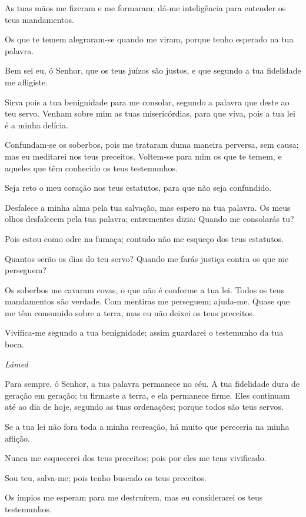 As tuas mãos me fizeram e me formaram; dá-me inteligência para
entender os teus mandamentos.

Os que te temem alegraram-se quando me viram, porque tenho
esperado na tua palavra.

Bem sei eu, ó Senhor, que os teus juízos são justos, e que
segundo a tua fidelidade me afligiste.

Sirva pois a tua benignidade para me consolar, segundo a palavra
que deste ao teu servo. Venham sobre mim as tuas
misericórdias, para que viva, pois a tua lei é a minha delícia.

Confundam-se os soberbos, pois me trataram duma maneira perversa,
sem causa; mas eu meditarei nos teus preceitos. Voltem-se
para mim os que te temem, e aqueles que têm conhecido os teus
testemunhos.

Seja reto o meu coração nos teus estatutos, para que não seja
confundido.

Desfalece a minha alma pela tua salvação, mas espero na tua
palavra. Os meus olhos desfalecem pela tua palavra;
entrementes dizia: Quando me consolarás tu?

Pois estou como odre na fumaça; contudo não me esqueço dos teus
estatutos.

Quantos serão os dias do teu servo? Quando me farás justiça
contra os que me perseguem?

Os soberbos me cavaram covas, o que não é conforme a tua lei.
Todos os teus mandamentos são verdade. Com mentiras me
perseguem; ajuda-me. Quase que me têm consumido sobre a
terra, mas eu não deixei os teus preceitos.

Vivifica-me segundo a tua benignidade; assim guardarei o
testemunho da tua boca.

\bigskip
\centerline{\emph{Lámed}}

Para sempre, ó Senhor, a tua palavra permanece no céu. A
tua fidelidade dura de geração em geração; tu firmaste a terra, e
ela permanece firme. Eles continuam até ao dia de hoje,
segundo as tuas ordenações; porque todos são teus servos.

Se a tua lei não fora toda a minha recreação, há muito que
pereceria na minha aflição.

Nunca me esquecerei dos teus preceitos; pois por eles me tens
vivificado.

Sou teu, salva-me; pois tenho buscado os teus preceitos.

Os ímpios me esperam para me destruírem, mas eu considerarei os
teus testemunhos.

